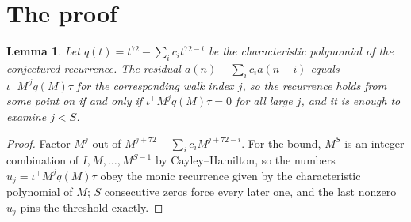 \documentclass[11pt,a4paper]{article}
\theoremstyle{plain}
\newtheorem{lemma}[theorem]{Lemma}
\theoremstyle{definition}
\begin{document}
\section{The proof}

\begin{lemma}\label{lem:crit}
Let $q(t)=t^{72}-\sum_i c_it^{72-i}$ be the characteristic polynomial of the
conjectured recurrence. The residual $a(n)-\sum_ic_ia(n-i)$ equals
$\iota^{\!\top}M^{\,j}q(M)\tau$ for the corresponding walk index $j$, so the recurrence
holds from some point on if and only if $\iota^{\!\top}M^{j}q(M)\tau=0$ for all large $j$,
and it is enough to examine $j<S$.
\end{lemma}

\begin{proof}
Factor $M^{j}$ out of $M^{j+72}-\sum_ic_iM^{j+72-i}$. For the bound, $M^{S}$
is an integer combination of $I,M,\dots,M^{S-1}$ by Cayley--Hamilton, so the numbers
$u_j=\iota^{\!\top}M^{j}q(M)\tau$ obey the monic recurrence given by the characteristic
polynomial of $M$; $S$ consecutive zeros force every later one, and the last nonzero $u_j$
pins the threshold exactly.
\end{proof}
\end{document}
